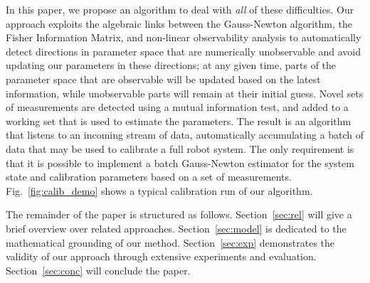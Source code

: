 In this paper, we propose an algorithm to deal with {\em all} of these
difficulties. Our approach exploits the algebraic links between the Gauss-Newton
algorithm, the Fisher Information Matrix, and non-linear observability analysis
to automatically detect directions in parameter space that are numerically
unobservable and avoid updating our parameters in these directions; at any given
time, parts of the parameter space that are observable will be updated based on
the latest information, while unobservable parts will remain at their initial
guess. Novel sets of measurements are detected using a mutual information test,
and added to a working set that is used to estimate the parameters. The result
is an algorithm that listens to an incoming stream of data, automatically
accumulating a batch of data that may be used to calibrate a full robot system.
The only requirement is that it is possible to implement a batch Gauss-Newton
estimator for the system state and calibration parameters based on a set of
measurements. Fig.~\ref{fig:calib_demo} shows a typical calibration run of our
algorithm.

The remainder of the paper is structured as follows. Section~\ref{sec:rel}
will give a brief overview over related approaches. Section~\ref{sec:model} is
dedicated to the mathematical grounding of our method.
Section~\ref{sec:exp} demonstrates the validity of our approach through
extensive experiments and evaluation. Section~\ref{sec:conc} will conclude the
paper.
